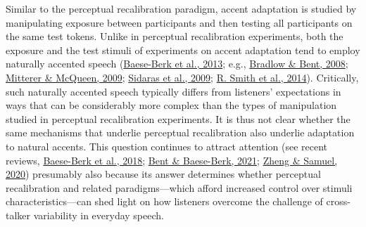 \documentclass[
  11pt,
  man,floatsintext]{apa6}
\begin{document}
Similar to the perceptual recalibration paradigm, accent adaptation is studied by manipulating exposure between participants and then testing all participants on the same test tokens. Unlike in perceptual recalibration experiments, both the exposure and the test stimuli of experiments on accent adaptation tend to employ naturally accented speech (\protect\hyperlink{ref-baeseberk2013}{Baese-Berk et al., 2013}; e.g., \protect\hyperlink{ref-bradlow-bent2008}{Bradlow \& Bent, 2008}; \protect\hyperlink{ref-mitterer-mcqueen2009}{Mitterer \& McQueen, 2009}; \protect\hyperlink{ref-sidaras2009}{Sidaras et al., 2009}; \protect\hyperlink{ref-smith2014}{R. Smith et al., 2014}). Critically, such naturally accented speech typically differs from listeners' expectations in ways that can be considerably more complex than the types of manipulation studied in perceptual recalibration experiments. It is thus not clear whether the same mechanisms that underlie perceptual recalibration also underlie adaptation to natural accents. This question continues to attract attention (see recent reviews, \protect\hyperlink{ref-baeseberk2018}{Baese-Berk et al., 2018}; \protect\hyperlink{ref-bent-baeseberk2021}{Bent \& Baese-Berk, 2021}; \protect\hyperlink{ref-zheng-samuel2020}{Zheng \& Samuel, 2020}) presumably also because its answer determines whether perceptual recalibration and related paradigms---which afford increased control over stimuli characteristics---can shed light on how listeners overcome the challenge of cross-talker variability in everyday speech.
\end{document}
